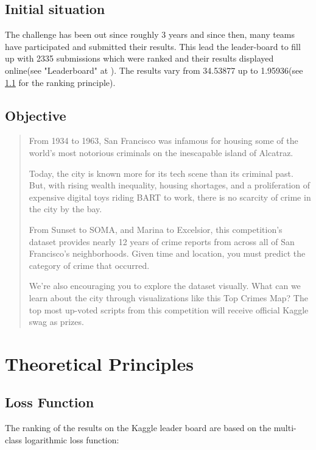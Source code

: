 \documentclass[titlepage]{article}
\begin{document}
\subsection{Initial situation}\label{ss:initial_situation}
The challenge has been out since roughly 3 years and since then, many teams have participated and submitted their results. This lead the leader-board to fill up with 2335 submissions which were ranked and their results displayed online(see "Leaderboard" at \cite{kgl_sf_crime}). The results vary from 34.53877 up to 1.95936(see \ref{ss:loss_function} for the ranking principle).

\subsection{Objective}\label{ss:objective}
\begin{quote}
From 1934 to 1963, San Francisco was infamous for housing some of the world's most notorious criminals on the inescapable island of Alcatraz.

Today, the city is known more for its tech scene than its criminal past. But, with rising wealth inequality, housing shortages, and a proliferation of expensive digital toys riding BART to work, there is no scarcity of crime in the city by the bay.

From Sunset to SOMA, and Marina to Excelsior, this competition's dataset provides nearly 12 years of crime reports from across all of San Francisco's neighborhoods. Given time and location, you must predict the category of crime that occurred.

We're also encouraging you to explore the dataset visually. What can we learn about the city through visualizations like this Top Crimes Map? The top most up-voted scripts from this competition will receive official Kaggle swag as prizes. 
\end{quote}
\citep{kgl_sf_crime}

\pagebreak
\section{Theoretical Principles}\label{s:theoretical_principles}
\subsection{Loss Function}\label{ss:loss_function}
The ranking of the results on the Kaggle leader board are based on the multi-class logarithmic loss function:
\end{document}
